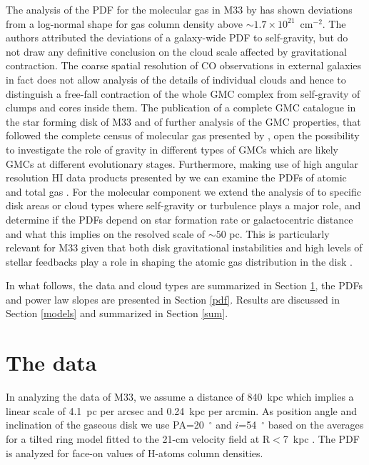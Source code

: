 \documentclass{aa}
\begin{document}
 
The analysis of the PDF for the molecular gas in M33 by \citet{druard14} has shown  
deviations from a log-normal shape for gas column density above $\sim 1.7\times 10^{21}$~cm$^{-2}$.
The authors attributed the deviations of a galaxy-wide PDF to self-gravity, but
do not draw any definitive conclusion on the cloud scale affected by gravitational
contraction. The coarse spatial resolution of CO observations in external galaxies in fact does not
allow analysis of the details of individual clouds and hence to distinguish a free-fall contraction of the
whole GMC complex from self-gravity of clumps and cores inside them. The publication of a complete
GMC catalogue in the star forming disk of M33 and of further analysis of the GMC properties, that
followed the complete census of molecular gas presented by \citet{druard14}, open the possibility to
investigate the role of gravity in different types of GMCs which are likely GMCs at different evolutionary stages. 
Furthermore, making use of high angular resolution HI data products presented by \citet{2014A&A...572A..23C} 
we can examine the PDFs of atomic and total gas .   For the molecular component we extend the analysis of 
\cite{druard14} to specific disk areas or cloud types where self-gravity  or turbulence plays a major role, and 
determine if the PDFs depend on  star formation rate or 
galactocentric distance and what this implies   on the resolved scale of $\sim50$ pc.  This is particularly
relevant for M33 given  that both  disk  gravitational instabilities 
and high levels of  stellar feedbacks play a role in shaping the  atomic gas distribution in the disk
\citep{2018MNRAS.tmp.1241D}.

In what follows, the data and cloud types are summarized in Section \ref{data},
the PDFs and power law slopes are presented in Section \ref{pdf}.
Results are discussed in Section \ref{models} and summarized in Section \ref{sum}.

\section{The data}
\label{data}

In analyzing the data of M33, we assume a distance of 840~kpc  \citep{1991ApJ...372..455F,2013ApJ...773...69G}
which implies a linear scale of 4.1~pc per arcsec and 0.24~kpc per arcmin. As
position angle and inclination of the gaseous disk we use PA=20~$^\circ$ and $i$=54~$^\circ$
based on the averages for a tilted ring model fitted to the 21-cm velocity field
at R$<$7~kpc \citep{2014A&A...572A..23C}. The PDF is analyzed for face-on values of  
H-atoms column densities.
 
\end{document}
